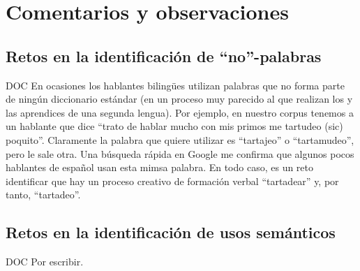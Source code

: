 \documentclass[11pt]{report}
\begin{document}
\part{Comentarios y observaciones}
\chapter{Retos en la identificación de ``no''-palabras}
DOC En ocasiones los hablantes bilingües utilizan palabras que no forma parte de ningún diccionario estándar (en un proceso muy parecido al que realizan los y las aprendices de una segunda lengua). Por ejemplo, en nuestro corpus tenemos a un hablante que dice ``trato de hablar mucho con mis primos me tartudeo (sic) poquito''. Claramente la palabra que quiere utilizar es ``tartajeo'' o ``tartamudeo'', pero le sale otra. Una búsqueda rápida en Google me confirma que algunos pocos hablantes de español usan esta mimsa palabra. En todo caso, es un reto identificar que hay un proceso creativo de formación verbal ``tartadear'' y, por tanto, ``tartadeo''. 
\chapter{Retos en la identificación de usos semánticos}
DOC Por escribir.
\end{document}
